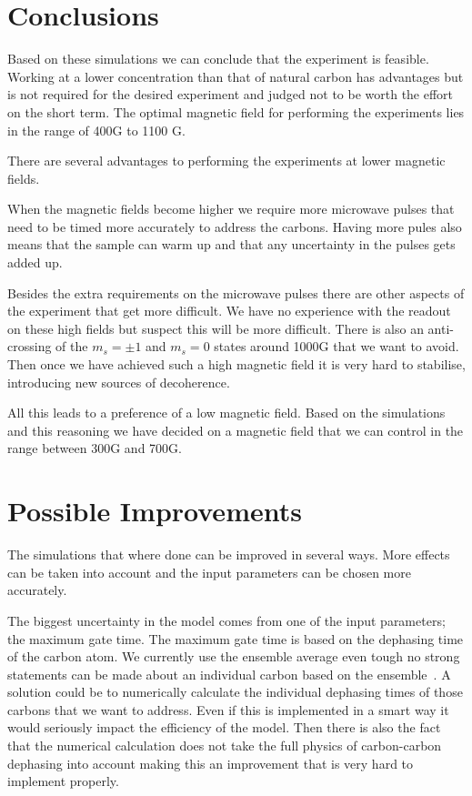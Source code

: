 \section{Conclusions}
\label{conclusions}

Based on these simulations we can conclude that the experiment is feasible. Working at a lower concentration than that of natural carbon has advantages but is not required for the desired experiment and judged not to be worth the effort on the short term. The optimal magnetic field for performing the experiments lies in the range of 400G to 1100 G. 

There are several advantages to performing the experiments at lower magnetic fields. 

When the magnetic fields become higher we require more microwave pulses that need to be timed more accurately to address the carbons. Having more pules also means that the sample can warm up and that any uncertainty in the pulses gets added up. 

Besides the extra requirements on the microwave pulses there are other aspects of the experiment that get more difficult. We have no experience with the readout on these high fields but suspect this will be more difficult. There is also an anti-crossing of the $m_s = \pm 1$ and $m_s = 0 $  states around 1000G that we want to avoid. Then once we have achieved such a high magnetic field it is very hard to stabilise, introducing new sources of decoherence. 

All this leads to a preference of a low magnetic field. Based on the simulations and this reasoning we have decided on a magnetic field that we can control in the range between 300G and 700G. 

\section{Possible Improvements}
\label{possibleimprovements}

The simulations that where done can be improved in several ways. More effects can be taken into account and the input parameters can be chosen more accurately. 

The biggest uncertainty in the model comes from one of the input parameters; the maximum gate time. The maximum gate time is based on the dephasing time of the carbon atom. We currently use the ensemble average even tough no strong statements can be made about an individual carbon based on the ensemble~\citep{Dobrovitski2008}. A solution could be to numerically calculate the individual dephasing times of those carbons that we want to address. Even if this is implemented in a smart way it would seriously impact the efficiency of the model. Then there is also the fact that the numerical calculation does not take the full physics of carbon-carbon dephasing into account making this an improvement that is very hard to implement properly. 

